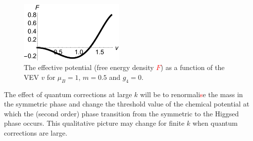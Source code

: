    \begin{figure}[h]
\begin{center}
\includegraphics[width=2in]{Chapter_3_Folder_1806.06976/figures/Fvsv.pdf}
\end{center}
       \caption[This figure shows the effective potential (free energy density) as a function of the VEV $v$ for $\mu_B=1$, $m=0.5$ and $g_4=0$.
       ]{ The effective potential (free energy density \textcolor{red}{$F$}) as a function of the VEV $v$ for $\mu_B=1$, $m=0.5$ and $g_4=0$.
}
\label{fvsv}
\end{figure}

The effect of  quantum corrections at large $k$ will be to renormali\textcolor{red}{s}e the mass  in the symmetric phase and change the threshold value of the chemical potential at which the (second order) phase transition from the symmetric to the Higgsed phase occurs. This qualitative picture may change for finite $k$ when quantum corrections are large.

